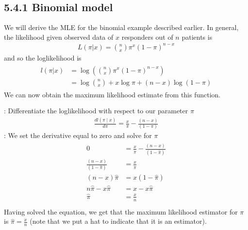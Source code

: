 \documentclass[letterpaper,10pt,english]{jupyterBook}
\begin{document}
\subsection{5.4.1 Binomial model}
\label{\detokenize{05.e. Likelihood:binomial-model}}
\sphinxAtStartPar
We will derive the MLE for the binomial example described earlier. In general, the likelihood given observed data of \(x\) responders out of \(n\) patients is
\begin{equation*}
\begin{split} 
L(\pi|x) = {n \choose x} \pi^{x} (1-\pi)^{n - x}
\end{split}
\end{equation*}
\sphinxAtStartPar
and so the log\sphinxhyphen{}likelihood is
\begin{equation*}
\begin{split} 
\begin{align*}
l(\pi|x) & = \log\left({n \choose x} \pi^{x} (1-\pi)^{n - x}\right) \\ 
& = \log {n \choose x} + x \log \pi + (n-x)\log (1-\pi)
\end{align*}
\end{split}
\end{equation*}
\sphinxAtStartPar
We can now obtain the maximum likelihood estimate from this function.

\sphinxAtStartPar
{}: Differentiate the log\sphinxhyphen{}likelihood with respect to our parameter \(\pi\)
\begin{equation*}
\begin{split}
\begin{equation}
\frac{d l \left( \pi \mid x \right)}{d \pi} =  \frac{x}{\pi}  -\frac{(n-x)}{(1-\pi)}
\end{equation}
\end{split}
\end{equation*}
\sphinxAtStartPar
{}: We set the derivative equal to zero and solve for \(\pi\)
\begin{equation*}
\begin{split}
\begin{align*}
0 &=  \frac{x}{\hat{\pi}}  -\frac{(n-x)}{(1-\hat{\pi})} \\
\frac{(n-x)}{(1-\hat{\pi})} &=  \frac{x}{\hat{\pi}}   \\
(n-x)\hat{\pi} &=  x(1-\hat{\pi}) \\
n\hat{\pi}-x\hat{\pi} &=  x-x\hat{\pi} \\
\hat{\pi} &=  \frac{x}{n} \\
\end{align*}
\end{split}
\end{equation*}
\sphinxAtStartPar
Having solved the equation, we get that the maximum likelihood estimator for \(\pi\) is \(\hat{\pi} =  \frac{x}{n}\) (note that we put a hat to indicate that it is an estimator).
\end{document}
